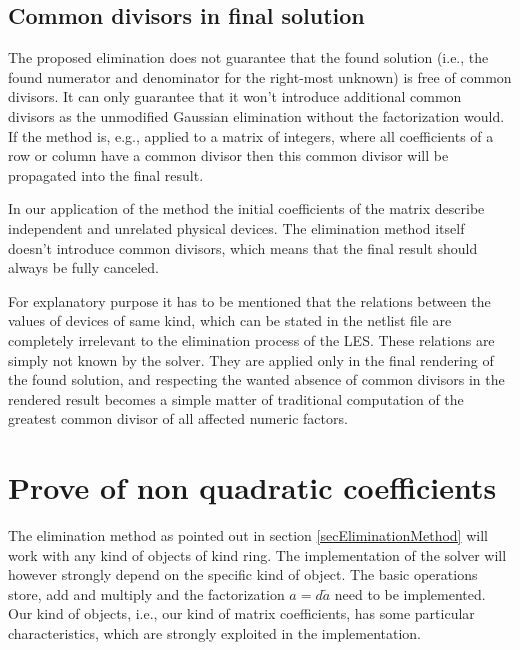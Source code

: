 \subsection{Common divisors in final solution}

The proposed elimination does not guarantee that the found solution (i.e.,
the found numerator and denominator for the right-most unknown) is free of
common divisors. It can only guarantee that it won't introduce additional
common divisors as the unmodified Gaussian elimination without the
factorization would. If the method is, e.g., applied to a matrix of
integers, where all coefficients of a row or column have a common divisor
then this common divisor will be propagated into the final result.


In our application of the method the initial coefficients of the matrix
describe independent and unrelated physical devices. The elimination
method itself doesn't introduce common divisors, which means that the
final result should always be fully canceled.

For explanatory purpose it has to be mentioned that the relations between
the values of devices of same kind, which can be stated in the netlist
file are completely irrelevant to the elimination process of the LES.
These relations are simply not known by the solver. They are applied only
in the final rendering of the found solution, and respecting the wanted
absence of common divisors in the rendered result becomes a simple matter
of traditional computation of the greatest common divisor of all affected
numeric factors.


\section{Prove of non quadratic coefficients}
\label{secProveOfNonQuadraticCoef}

The elimination method as pointed out in section
\ref{secEliminationMethod} will work with any kind of objects of kind
ring. The implementation of the solver will however strongly depend on the
specific kind of object. The basic operations store, add and multiply and
the factorization $a = d \tilde a$ need to be implemented. Our kind of
objects, i.e., our kind of matrix coefficients, has some particular
characteristics, which are strongly exploited in the implementation.

